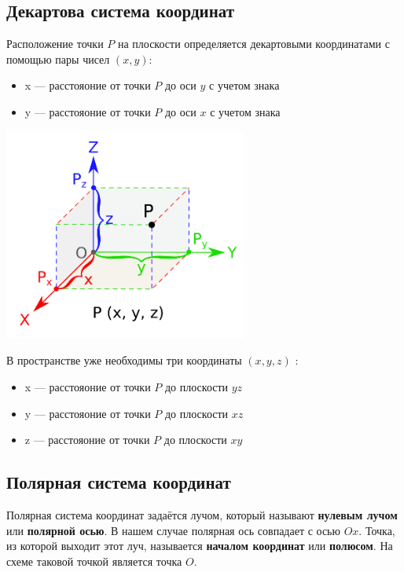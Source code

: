 \documentclass[a4paper,12pt,oneside]{extbook}
\theoremstyle{numbered}
\theoremstyle{unnumbered}
\theoremstyle{named}
\theoremstyle{unnumbered}
\theoremstyle{named}
\theoremstyle{named}
\theoremstyle{named}
\begin{document}
\subsection{Декартова система координат}

Расположение точки \(P\) на плоскости определяется декартовыми координатами с помощью пары чисел \((x, y)\):
\begin{itemize}
    \item {x — расстояоние от точки \(P\) до оси \(y\) с учетом знака}
    \item {y — расстояоние от точки \(P\) до оси \(x\) с учетом знака}
\end{itemize}

\begin{center}
    \includegraphics[width=0.6\textwidth]{cartesian_system.png}
\end{center}

В пространстве уже необходимы три координаты \((x, y, z)\) :
\begin{itemize}
    \item {x — расстояоние от точки \(P\) до плоскости \(yz\)}
    \item {y — расстояоние от точки \(P\) до плоскости \(xz\)}
    \item {z — расстояоние от точки \(P\) до плоскости \(xy\)}
\end{itemize}

\subsection{Полярная система координат}
Полярная система координат задаётся лучом, который называют \textbf{нулевым лучом} или \textbf{полярной осью}.
В нашем случае полярная ось совпадает с осью \(Ox\).
Точка, из которой выходит этот луч, называется \textbf{началом координат} или \textbf{полюсом}.
На схеме таковой точкой является точка \(O\).
\end{document}

